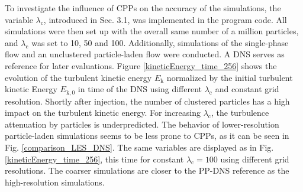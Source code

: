 \documentclass[11pt,a4paper,openany,oneside,parskip=half*]{article}
\begin{document}
\newline
To investigate the influence of CPPs on the accuracy of the simulations, the variable $\lambda_\mathrm{c}$, introduced in Sec. 3.1, was implemented in the program code. All simulations were then set up with the overall same number of a million particles, and $\lambda_\mathrm{c}$ was set to 10, 50 and 100. Additionally, simulations of the single-phase flow and an unclustered particle-laden flow were conducted. A DNS serves as reference for later evaluations. 
\newline %
Figure \ref{kineticEnergy_time_256} shows the evolution of the turbulent kinetic energy $E_\mathrm{k}$ normalized by the initial turbulent kinetic Energy $E_\mathrm{k,0}$ in time of the DNS using different $\lambda_\mathrm{c}$ and constant grid resolution. Shortly after injection, the number of clustered particles has a high impact on the turbulent kinetic energy. For increasing $\lambda_\mathrm{c}$, the turbulence attenuation by particles is underpredicted.
\newline %
The behavior of lower-resolution particle-laden simulations seems to be less prone to CPPs, as it can be seen in Fig. \ref{comparison_LES_DNS}. The same variables are displayed as in Fig. \ref{kineticEnergy_time_256}, this time for constant $\lambda_\mathrm{c}=100$ using different grid resolutions. The coarser simulations are closer to the PP-DNS reference as the high-resolution simulations.
\end{document}
